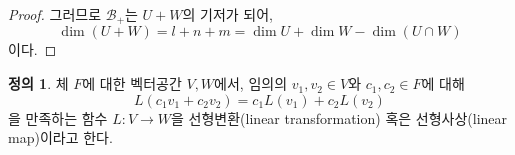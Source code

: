 \documentclass[unfonts,oneside,a4paper]{oblivoir}
\theoremstyle{definition}
\newtheorem{definition}{정의}[section]
\theoremstyle{theorem}
\theoremstyle{theorem}
\theoremstyle{remark}
\theoremstyle{remark}
\theoremstyle{remark}
\theoremstyle{remark}
\renewcommand{\vec}[1]{\bm{\mathit{#1}}}
\begin{document}
\begin{proof}
    그러므로 $\mathcal B_+$는 $U + W$의 기저가 되어,
    \begin{equation*}
        \dim (U + W) = l + n + m = \dim U + \dim W - \dim (U \cap W)
    \end{equation*}
    이다.
\end{proof}

\begin{definition}
    체 $F$에 대한 벡터공간 $V, W$에서, 임의의 $\vec v_1, \vec v_2 \in V$와 $c_1, c_2 \in F$에 대해
    \begin{equation*}
        L(c_1 \vec v_1 + c_2 \vec v_2) = c_1 L(\vec v_1) + c_2 L(\vec v_2)
    \end{equation*}
    을 만족하는 함수 $L: V \rightarrow W$을 선형변환(linear transformation) 혹은 선형사상(linear map)이라고 한다.
\end{definition}
\end{document}
